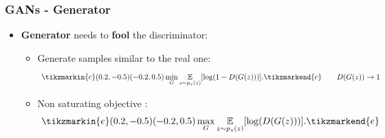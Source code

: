 \documentclass{beamer}
\begin{document}
{
\begin{frame}[plain]
\end{frame}
}

\begin{frame}
\frametitle{GANs - Generator}
\begin{itemize}
\item \textbf{Generator} needs to \textbf{fool} the discriminator:
\begin{itemize}	
\item<1-> \alert<+>{Generate samples similar to the real one:
\begin{equation}
\tikzmarkin{c}(0.2,-0.5)(-0.2,0.5)
\min_G  \underset{z \sim p_z(z)}{\mathbb{E}}[\log(1 - D(G(z)))].
\tikzmarkend{c}
\tag*{$D(G(z)) \rightarrow 1$}
\end{equation}}
\item<2-> \alert<+>{Non saturating objective \citep{goodfellowGenerativeAdversarialNetworks2014}:
\begin{equation}
\tikzmarkin{e}(0.2,-0.5)(-0.2,0.5)
\max_G  \underset{z \sim p_z(z)}{\mathbb{E}}[\log( D(G(z)))].
\tikzmarkend{e}
\end{equation}
}
\end{itemize}
\end{itemize}

\end{frame}
\end{document}
